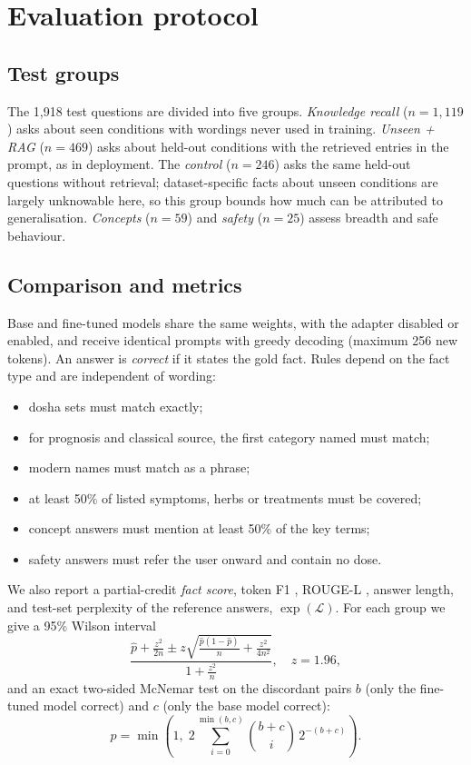 \documentclass[5p,times,authoryear]{elsarticle}
\begin{document}
\section{Evaluation protocol}
\label{sec:eval}

\subsection{Test groups}
The 1,918 test questions are divided into five groups. \emph{Knowledge recall} ($n=1{,}119$) asks about seen conditions with wordings never used in training. \emph{Unseen + RAG} ($n=469$) asks about held-out conditions with the retrieved entries in the prompt, as in deployment. The \emph{control} ($n=246$) asks the same held-out questions without retrieval; dataset-specific facts about unseen conditions are largely unknowable here, so this group bounds how much can be attributed to generalisation. \emph{Concepts} ($n=59$) and \emph{safety} ($n=25$) assess breadth and safe behaviour.

\subsection{Comparison and metrics}
Base and fine-tuned models share the same weights, with the adapter disabled or enabled, and receive identical prompts with greedy decoding (maximum 256 new tokens). An answer is \emph{correct} if it states the gold fact. Rules depend on the fact type and are independent of wording:
\begin{itemize}
\item dosha sets must match exactly;
\item for prognosis and classical source, the first category named must match;
\item modern names must match as a phrase;
\item at least 50\% of listed symptoms, herbs or treatments must be covered;
\item concept answers must mention at least 50\% of the key terms;
\item safety answers must refer the user onward and contain no dose.
\end{itemize}
We also report a partial-credit \emph{fact score}, token F1 \citep{rajpurkar2016squad}, ROUGE-L \citep{lin2004rouge}, answer length, and test-set perplexity of the reference answers, $\exp(\mathcal{L})$. For each group we give a 95\% Wilson interval \citep{wilson1927}
\begin{equation}
\frac{\hat p + \frac{z^2}{2n} \pm z\sqrt{\frac{\hat p(1-\hat p)}{n}+\frac{z^2}{4n^2}}}{1+\frac{z^2}{n}}, \quad z=1.96 ,
\label{eq:wilson}
\end{equation}
and an exact two-sided McNemar test \citep{mcnemar1947} on the discordant pairs $b$ (only the fine-tuned model correct) and $c$ (only the base model correct):
\begin{equation}
p = \min\!\left(1,\; 2\sum_{i=0}^{\min(b,c)}\binom{b+c}{i}\,2^{-(b+c)}\right).
\label{eq:mcnemar}
\end{equation}
\end{document}
